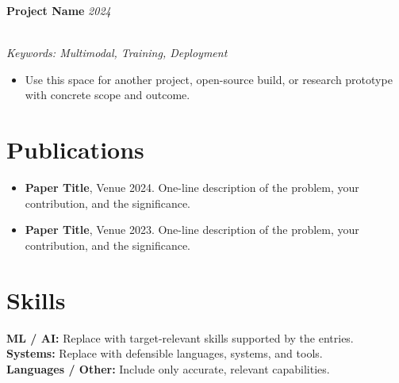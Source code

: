 \documentclass[a4paper,11pt]{extarticle}
\newcommand{\cvneedspace}[1]{%
  \par\ifdim\dimexpr\pagegoal-\pagetotal\relax<#1\relax\newpage\fi
}
\newcommand{\cvsection}[1]{\cvneedspace{4\baselineskip}\section{#1}}
\newcommand{\projectentry}[2]{%
  \cvneedspace{4\baselineskip}%
  \textbf{#1} \hfill \textit{#2}
}
\newcommand{\projectkeywords}[1]{%
  \\[-1pt]{\footnotesize\textit{Keywords: #1}}
}
\begin{document}
\projectentry{Project Name}{2024}
\projectkeywords{Multimodal, Training, Deployment}
\vspace{-0.7em}
{\small
\begin{itemize}
  \item Use this space for another project, open-source build, or research prototype with concrete scope and outcome.
\end{itemize}
}

\cvsection{Publications}
{\small
\begin{itemize}
  \item \textbf{Paper Title}, Venue 2024. One-line description of the problem, your contribution, and the significance.
  \item \textbf{Paper Title}, Venue 2023. One-line description of the problem, your contribution, and the significance.
\end{itemize}
}

\cvsection{Skills}
{\small
\textbf{ML / AI:} Replace with target-relevant skills supported by the entries.\\
\textbf{Systems:} Replace with defensible languages, systems, and tools.\\
\textbf{Languages / Other:} Include only accurate, relevant capabilities.
}
\end{document}
